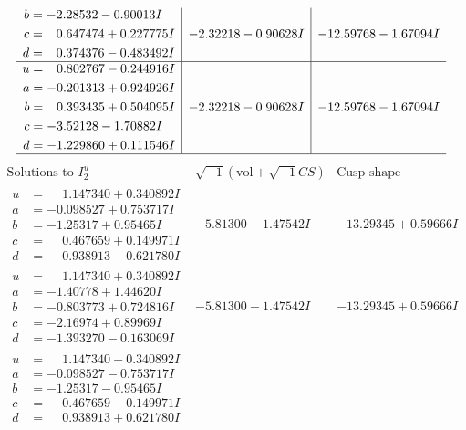 \documentclass[1p]{elsarticle_modified}
\theoremstyle{definition}
\newcommand{\I}{\sqrt{-1}}
\begin{document}
$$\begin{array}{c|c|c}
\begin{aligned}
b &= -2.28532 - 0.90013 I \\
c &= \phantom{-}0.647474 + 0.227775 I \\
d &= \phantom{-}0.374376 - 0.483492 I\end{aligned}
 & -2.32218 - 0.90628 I & -12.59768 - 1.67094 I \\ \hline\begin{aligned}
u &= \phantom{-}0.802767 - 0.244916 I \\
a &= -0.201313 + 0.924926 I \\
b &= \phantom{-}0.393435 + 0.504095 I \\
c &= -3.52128 - 1.70882 I \\
d &= -1.229860 + 0.111546 I\end{aligned}
 & -2.32218 - 0.90628 I & -12.59768 - 1.67094 I\\
 \hline 
 \end{array}$$\newpage$$\begin{array}{c|c|c}  
\text{Solutions to }I^u_{2}& \I (\text{vol} + \sqrt{-1}CS) & \text{Cusp shape}\\
 \hline 
\begin{aligned}
u &= \phantom{-}1.147340 + 0.340892 I \\
a &= -0.098527 + 0.753717 I \\
b &= -1.25317 + 0.95465 I \\
c &= \phantom{-}0.467659 + 0.149971 I \\
d &= \phantom{-}0.938913 - 0.621780 I\end{aligned}
 & -5.81300 - 1.47542 I & -13.29345 + 0.59666 I \\ \hline\begin{aligned}
u &= \phantom{-}1.147340 + 0.340892 I \\
a &= -1.40778 + 1.44620 I \\
b &= -0.803773 + 0.724816 I \\
c &= -2.16974 + 0.89969 I \\
d &= -1.393270 - 0.163069 I\end{aligned}
 & -5.81300 - 1.47542 I & -13.29345 + 0.59666 I \\ \hline\begin{aligned}
u &= \phantom{-}1.147340 - 0.340892 I \\
a &= -0.098527 - 0.753717 I \\
b &= -1.25317 - 0.95465 I \\
c &= \phantom{-}0.467659 - 0.149971 I \\
d &= \phantom{-}0.938913 + 0.621780 I\end{aligned}

\end{array}$$
\end{document}
